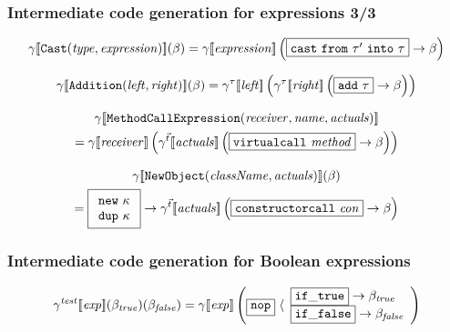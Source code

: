 \documentclass[11pt]{beamer}  %
\begin{document}
\begin{frame}
\frametitle{Intermediate code generation for expressions 3/3}

\[
  \gen{\mathtt{Cast(\mathit{\mathit{type},\mathit{expression}})}}(\beta)=
      \gen{\mathit{expression}}\left(\fbox{$\mathtt{cast\ from\ }\tau'\mathtt{\ into\ }\tau$}
        \to\beta\right)
\]

\[
  \gamma[\![{\mathtt{Addition(\mathit{left},\mathit{right})}}]\!](\beta)=
    \gamma^{\tau}[\![{\mathit{left}}]\!]\left(
      \gamma^{\tau}[\![{\mathit{right}}]\!]\left(\fbox{$\mathtt{add}\ \tau$}
      \to\beta\right)\right)
\]

\begin{multline*}
  \gamma[\![{\mathtt{MethodCallExpression(\mathit{receiver},\mathit{name},
    \mathit{actuals})}}]\!]\\
  =\gamma[\![{\mathit{receiver}}]\!]\left(
    \gamma^{\vec{t}}[\![{\mathit{actuals}}]\!]
    \left(\fbox{$\mathtt{virtualcall}\ \mathit{method}$}
    \to\beta\right)\right)
\end{multline*}

\begin{multline*}
  \gamma[\![{\mathtt{NewObject(\mathit{className},\mathit{actuals})}}]\!](\beta)\\
    =\fbox{$\begin{array}{l}
      \mathtt{new}\ \kappa\\
      \mathtt{dup}\ \kappa
    \end{array}$}\to
   \gamma^{\vec{t}}[\![{\mathit{actuals}}]\!]
   \left(\fbox{$\mathtt{constructorcall}\ \mathit{con}$}\to\beta\right)
\end{multline*}

\end{frame}

\begin{frame}
\frametitle{Intermediate code generation for Boolean expressions}

\[
  \gamma^{\mathit{test}}[\![{\mathit{exp}}]\!](\beta_{\mathit{true}})(\beta_\mathit{false})=
    \gamma[\![{\mathit{exp}}]\!]\left(
      \fbox{$\mathtt{nop}$}\,\,\langle
    \begin{array}{l}
        \fbox{$\mathtt{if\_true}$}\to\beta_{\mathit{true}}\\
        \fbox{$\mathtt{if\_false}$}\to\beta_\mathit{false}
    \end{array}
    \right)
\]

\end{frame}
\end{document}
